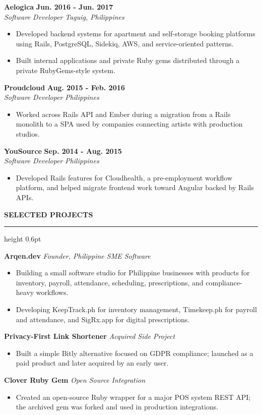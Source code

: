 \documentclass[10pt,letterpaper]{article}
\newcommand{\sectionheading}[1]{%
  \vspace{11pt}
  {\large\bfseries\MakeUppercase{#1}}\par
  \vspace{1pt}
  \hrule height 0.6pt
  \vspace{5pt}
}
\newcommand{\roleentry}[4]{%
  \textbf{#1} \hfill \textbf{#2}\\
  \textit{#3} \hfill \textit{#4}\\[-2pt]
}
\newcommand{\projectentry}[2]{%
  \textbf{#1} \hfill \textit{#2}\\[-2pt]
}
\begin{document}
\roleentry{Aelogica}{Jun. 2016 - Jun. 2017}{Software Developer}{Taguig, Philippines}
\begin{itemize}
  \item Developed backend systems for apartment and self-storage booking platforms using Rails, PostgreSQL, Sidekiq, AWS, and service-oriented patterns.
  \item Built internal applications and private Ruby gems distributed through a private RubyGems-style system.
\end{itemize}

\roleentry{Proudcloud}{Aug. 2015 - Feb. 2016}{Software Developer}{Philippines}
\begin{itemize}
  \item Worked across Rails API and Ember during a migration from a Rails monolith to a SPA used by companies connecting artists with production studios.
\end{itemize}

\pagebreak

\roleentry{YouSource}{Sep. 2014 - Aug. 2015}{Software Developer}{Philippines}
\begin{itemize}
  \item Developed Rails features for Cloudhealth, a pre-employment workflow platform, and helped migrate frontend work toward Angular backed by Rails APIs.
\end{itemize}

\sectionheading{Selected Projects}
\projectentry{Arqen.dev}{Founder, Philippine SME Software}
\begin{itemize}
  \item Building a small software studio for Philippine businesses with products for inventory, payroll, attendance, scheduling, prescriptions, and compliance-heavy workflows.
  \item Developing KeepTrack.ph for inventory management, Timekeep.ph for payroll and attendance, and SigRx.app for digital prescriptions.
\end{itemize}

\projectentry{Privacy-First Link Shortener}{Acquired Side Project}
\begin{itemize}
  \item Built a simple Bitly alternative focused on GDPR compliance; launched as a paid product and later acquired by an early user.
\end{itemize}

\projectentry{Clover Ruby Gem}{Open Source Integration}
\begin{itemize}
  \item Created an open-source Ruby wrapper for a major POS system REST API; the archived gem was forked and used in production integrations.
\end{itemize}
\end{document}
